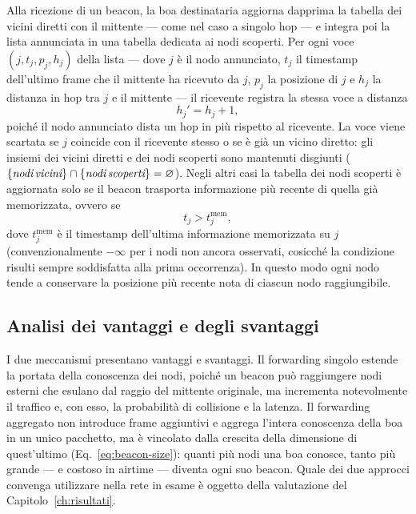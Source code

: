Alla ricezione di un beacon, la boa destinataria aggiorna dapprima la tabella dei vicini
diretti con il mittente --- come nel caso a singolo hop --- e integra poi la lista
annunciata in una tabella dedicata ai nodi scoperti. Per ogni voce $(j, t_j, p_j, h_j)$
della lista --- dove $j$ \`e il nodo annunciato, $t_j$ il timestamp dell'ultimo frame che
il mittente ha ricevuto da $j$, $p_j$ la posizione di $j$ e $h_j$ la distanza in hop tra
$j$ e il mittente --- il ricevente registra la stessa voce a distanza
\begin{equation}
  h_j' = h_j + 1,
  \label{eq:append-hop}
\end{equation}
poich\'e il nodo annunciato dista un hop in pi\`u rispetto al ricevente. La voce viene
scartata se $j$ coincide con il ricevente stesso o se \`e gi\`a un vicino diretto: gli
insiemi dei vicini diretti e dei nodi scoperti sono mantenuti disgiunti
($\{\emph{nodi\,vicini}\}\cap\{\emph{nodi\,scoperti}\} = \varnothing$). Negli altri casi
la tabella dei nodi scoperti \`e aggiornata solo se il beacon trasporta informazione
pi\`u recente di quella gi\`a memorizzata, ovvero se
\begin{equation}
  t_j > t_j^{\text{mem}},
  \label{eq:append-fresh}
\end{equation}
dove $t_j^{\text{mem}}$ \`e il timestamp dell'ultima informazione memorizzata su $j$
(convenzionalmente $-\infty$ per i nodi non ancora osservati, cosicch\'e la condizione
risulti sempre soddisfatta alla prima occorrenza). In questo modo ogni nodo tende a
conservare la posizione pi\`u recente nota di ciascun nodo raggiungibile.

\subsection{Analisi dei vantaggi e degli svantaggi}
\label{sec:tradeoff}
I due meccanismi presentano vantaggi e svantaggi. Il forwarding singolo estende la portata della conoscenza dei nodi, poich\'e
un beacon pu\`o raggiungere nodi esterni che esulano dal raggio del mittente originale, ma incrementa
notevolmente il traffico e, con esso, la probabilit\`a di collisione e la latenza. 
Il forwarding aggregato non introduce frame aggiuntivi e aggrega l'intera conoscenza della boa in un unico pacchetto, 
ma \`e vincolato dalla crescita della dimensione di quest'ultimo (Eq.~\ref{eq:beacon-size}):
quanti pi\`u nodi una boa conosce, tanto pi\`u grande --- e costoso in airtime --- diventa
ogni suo beacon. 
Quale dei due approcci convenga utilizzare nella rete in esame \`e oggetto della valutazione del Capitolo~\ref{ch:risultati}.

